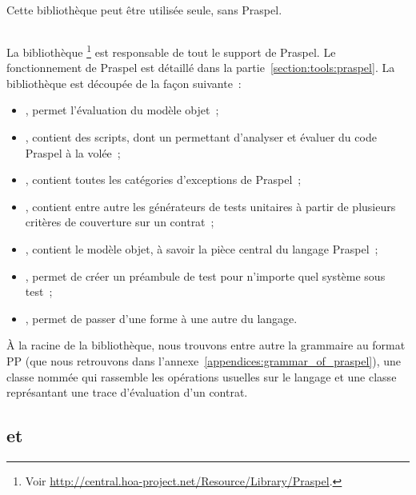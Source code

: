 Cette bibliothèque peut être utilisée seule, sans Praspel.

\subsection{}
\label{subsection:tools:hoa-praspel}

La bibliothèque \footnote{Voir
\url{http://central.hoa-project.net/Resource/Library/Praspel}.} est responsable
de tout le support de Praspel. Le fonctionnement de Praspel est détaillé dans la
partie~\ref{section:tools:praspel}. La bibliothèque est découpée de la façon
suivante~:
%
\begin{itemize}

\item {}, permet l'évaluation du modèle objet~;

\item {}, contient des scripts, dont un  permettant
d'analyser et évaluer du code Praspel à la volée~;

\item {}, contient toutes les catégories d'exceptions de Praspel~;

\item {}, contient entre autre les générateurs de tests unitaires à
partir de plusieurs critères de couverture sur un contrat~;

\item {}, contient le modèle objet, à savoir la pièce central du
langage Praspel~;

\item {}, permet de créer un préambule de test pour n'importe quel
système sous test~;

\item {}, permet de passer d'une forme à une autre du langage.

\end{itemize}

À la racine de la bibliothèque, nous trouvons entre autre la grammaire au format
PP (que nous retrouvons dans l'annexe~\ref{appendices:grammar_of_praspel}), une
classe nommée  qui rassemble les opérations usuelles
sur le langage et une classe représantant une trace d'évaluation d'un contrat.

\subsection{ et }
\label{subsection:tools:hoa-compiler-regex}

